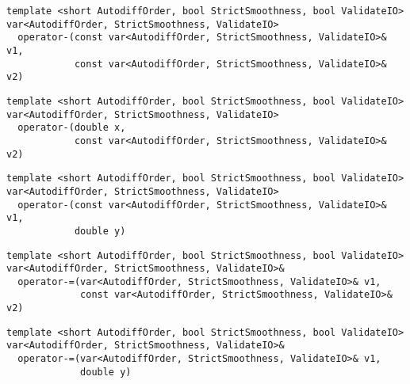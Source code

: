 \begin{tcolorbox}[colback=white,colframe=gray90, coltitle=black,boxrule=3pt,
fonttitle=\bfseries,title= Operator Subtraction]

\begin{verbatim}
template <short AutodiffOrder, bool StrictSmoothness, bool ValidateIO>
var<AutodiffOrder, StrictSmoothness, ValidateIO>
  operator-(const var<AutodiffOrder, StrictSmoothness, ValidateIO>& v1,
            const var<AutodiffOrder, StrictSmoothness, ValidateIO>& v2)

\end{verbatim}

\begin{verbatim}
template <short AutodiffOrder, bool StrictSmoothness, bool ValidateIO>
var<AutodiffOrder, StrictSmoothness, ValidateIO>
  operator-(double x,
            const var<AutodiffOrder, StrictSmoothness, ValidateIO>& v2)

\end{verbatim}

\begin{verbatim}
template <short AutodiffOrder, bool StrictSmoothness, bool ValidateIO>
var<AutodiffOrder, StrictSmoothness, ValidateIO>
  operator-(const var<AutodiffOrder, StrictSmoothness, ValidateIO>& v1,
            double y)

\end{verbatim}

\end{tcolorbox}

\begin{tcolorbox}[colback=white,colframe=gray90, coltitle=black,boxrule=3pt,
fonttitle=\bfseries,title= Operator Subtraction Assignment]

\begin{verbatim}
template <short AutodiffOrder, bool StrictSmoothness, bool ValidateIO>
var<AutodiffOrder, StrictSmoothness, ValidateIO>&
  operator-=(var<AutodiffOrder, StrictSmoothness, ValidateIO>& v1,
             const var<AutodiffOrder, StrictSmoothness, ValidateIO>& v2)

\end{verbatim}

\begin{verbatim}
template <short AutodiffOrder, bool StrictSmoothness, bool ValidateIO>
var<AutodiffOrder, StrictSmoothness, ValidateIO>&
  operator-=(var<AutodiffOrder, StrictSmoothness, ValidateIO>& v1,
             double y)

\end{verbatim}

\end{tcolorbox}

